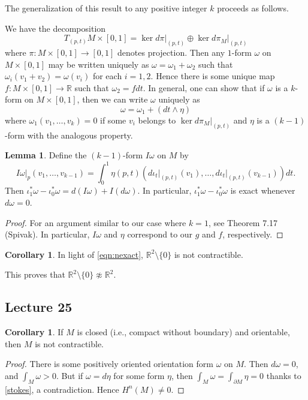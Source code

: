 \documentclass[10pt,letterpaper,cm]{nupset}
\theoremstyle{definition}
\theoremstyle{theorem}
\newtheorem{lemma}[definition]{Lemma}
\newtheorem{corollary}[definition]{Corollary}
\theoremstyle{remark}
\newcommand{\R}{\mathbb R}
\newcommand{\1}{\mathbf{1}}
\newcommand{\0}{\vec 0}
\begin{document}
\medskip


The generalization of this result to any positive integer $k$ proceeds as follows.

\medskip


We have the decomposition $$T_{(p,t)}M \times \left[0,1\right] = \ker d\pi\bigr\rvert_{(p,t)} \oplus \ker d\pi_M\bigr\rvert_{(p,t)}$$ where $\pi: M \times \left[0,1\right]\to \left[0,1\right]$ denotes projection. Then any $1$-form $\omega$ on $M \times \left[0,1\right]$ may be written uniquely as $\omega = \omega_1 + \omega_2$ such that $\omega_i(v_1 + v_2) = \omega(v_i)$ for each $i=1, 2$. Hence there is some unique map $f : M \times \left[0,1\right] \to \R$ such that $\omega_2 = f dt$. In general, one can show that if $\omega$ is a $k$-form on $M \times \left[0,1\right]$, then we can write $\omega$ uniquely as $$\omega = \omega_1 + (dt \wedge \eta)$$ where $\omega_1(v_1, \ldots, v_k) =0$ if some $v_i$ belongs to $\ker d\pi_M\bigr\rvert_{(p,t)}$ and $\eta$ is a $(k-1)$-form with the analogous property.
\begin{lemma}\label{exact}
Define the $(k-1)$-form $I\omega$ on $M$ by $$I \omega \bigr\rvert_p(v_1, \ldots, v_{k-1}) = \int_0^1 \eta(p, t)\left(d\iota_t\bigr\rvert_{(p,t)}(v_1), \ldots, d\iota_t\bigr\rvert_{(p,t)}(v_{k-1})\right)dt   .$$ Then $\iota^{\ast}_1\omega  - \iota^{\ast}_0 \omega = d(I\omega) + I(d\omega)$. In particular, $\iota^{\ast}_1\omega  - \iota^{\ast}_0 \omega$ is exact whenever $d\omega =0$.
\end{lemma}
\begin{proof}
For an argument similar to our  case where $k=1$,  see Theorem 7.17 (Spivak). In particular, $I\omega$ and $\eta$ correspond to our $g$ and $f$, respectively.
\end{proof} %


\smallskip

\begin{corollary}
In light of \eqref{eqn:nexact}, $\R^2\setminus \{0\}$ is not contractible.
\end{corollary}

This proves that $\R^2\setminus \{0\} \not\approx \R^2$.

\subsection{Lecture 25}

\begin{corollary}
If $M$ is closed (i.e., compact without boundary) and orientable, then $M$ is not contractible.
\end{corollary}
\begin{proof}
There is some positively oriented orientation form $\omega$ on $M$. Then $d\omega =0$, and $\int_M \omega >0$. But if $\omega = d \eta$ for some form $\eta$, then $\int_M \omega =  \int_{\partial{M}} \eta =0$ thanks to \cref{stokes}, a contradiction. Hence $H^n(M) \ne 0$.
\end{proof}
\end{document}
